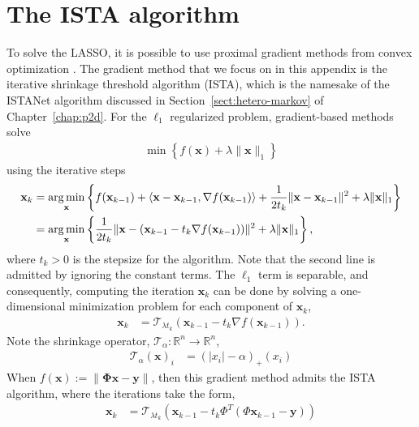 \section{The ISTA algorithm}
To solve the LASSO, it is possible to use proximal gradient methods from convex optimization \cite{ref:beck2009fast}. The gradient method that we focus on in this appendix is the iterative shrinkage threshold algorithm (ISTA), which is the namesake of the ISTANet algorithm discussed in Section~\ref{sect:hetero-markov} of Chapter~\ref{chap:p2d}. For the $\ell_1$ regularized problem, gradient-based methods solve 
\begin{align*}
    \min \left\{f(\mathbf{x})+\lambda\|\mathbf{x}\|_1\right\}
\end{align*}
using the iterative steps
\begin{align*}
    \mathbf{x}_k &= \operatorname*{arg\,min}_{\mathbf{x}} \left\{f(\mathbf{x}_{k-1}) + \langle \mathbf{x} - \mathbf{x}_{k-1}, \nabla f(\mathbf{x}_{k-1}) \rangle + \frac{1}{2t_k}\|\mathbf{x} - \mathbf{x}_{k-1}\|^2 + \lambda\|\mathbf{x}\|_1\right\} \\
    &= \operatorname*{arg\,min}_{\mathbf{x}} \left\{\frac{1}{2t_k}\|\mathbf{x} - (\mathbf{x}_{k-1} - t_k\nabla f(\mathbf{x}_{k-1}))\|^2 + \lambda\|\mathbf{x}\|_1\right\},
\end{align*}
where $t_k>0$ is the stepsize for the algorithm. Note that the second line is admitted by ignoring the constant terms. The $\ell_1$ term is separable, and consequently, computing the iteration $\mathbf{x}_k$ can be done by solving a one-dimensional minimization problem for each component of $\mathbf{x}_k$,
\begin{align*}
    \mathbf{x}_k &= \mathcal{T}_{\lambda t_k} (\mathbf{x}_{k-1} - t_k\nabla f(\mathbf{x}_{k-1})).
\end{align*}
Note the shrinkage operator, $\mathcal{T}_{\alpha} : \mathbb{R}^n \to \mathbb{R}^n$,
\begin{align*}
    \mathcal{T}_{\alpha}(\mathbf{x})_i &= (|x_i| - \alpha)_{+}(x_i)
\end{align*}
When $f(\mathbf{x}) := \|\mathbf{\Phi}\mathbf{x}-\mathbf{y}\|$, then this gradient method admits the ISTA algorithm, where the iterations take the form,
\begin{align}
    \mathbf{x}_k &= \mathcal{T}_{\lambda t_k}(\mathbf{x}_{k-1} - t_k\Phi^T(\Phi \mathbf{x}_{k-1} - \mathbf{y}))
\end{align}